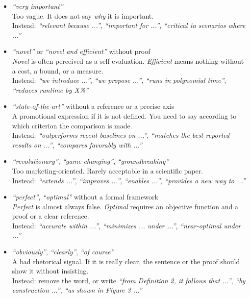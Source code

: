 \documentclass[11pt,a4paper]{article}
\theoremstyle{definition}
\begin{document}
\begin{itemize}

    \item \textit{``very important''} \\
    Too vague. It does not say \emph{why} it is important. \\
    Instead: \textit{``relevant because ...''}, \textit{``important for ...''}, \textit{``critical in scenarios where ...''}

    \item \textit{``novel''} or \textit{``novel and efficient''} without proof \\
    \textit{Novel} is often perceived as a self-evaluation. \textit{Efficient} means nothing without a cost, a bound, or a measure. \\
    Instead: \textit{``we introduce ...''}, \textit{``we propose ...''}, \textit{``runs in polynomial time''}, \textit{``reduces runtime by X\%''}

    \item \textit{``state-of-the-art''} without a reference or a precise axis \\
    A promotional expression if it is not defined. You need to say according to which criterion the comparison is made. \\
    Instead: \textit{``outperforms recent baselines on ...''}, \textit{``matches the best reported results on ...''}, \textit{``compares favorably with ...''}

    \item \textit{``revolutionary''}, \textit{``game-changing''}, \textit{``groundbreaking''} \\
    Too marketing-oriented. Rarely acceptable in a scientific paper. \\
    Instead: \textit{``extends ...''}, \textit{``improves ...''}, \textit{``enables ...''}, \textit{``provides a new way to ...''}

    \item \textit{``perfect''}, \textit{``optimal''} without a formal framework \\
    \textit{Perfect} is almost always false. \textit{Optimal} requires an objective function and a proof or a clear reference. \\
    Instead: \textit{``accurate within ...''}, \textit{``minimizes ... under ...''}, \textit{``near-optimal under ...''}

    \item \textit{``obviously''}, \textit{``clearly''}, \textit{``of course''} \\
    A bad rhetorical signal. If it is really clear, the sentence or the proof should show it without insisting. \\
    Instead: remove the word, or write \textit{``from Definition 2, it follows that ...''}, \textit{``by construction ...''}, \textit{``as shown in Figure 3 ...''}


\end{itemize}
\end{document}
